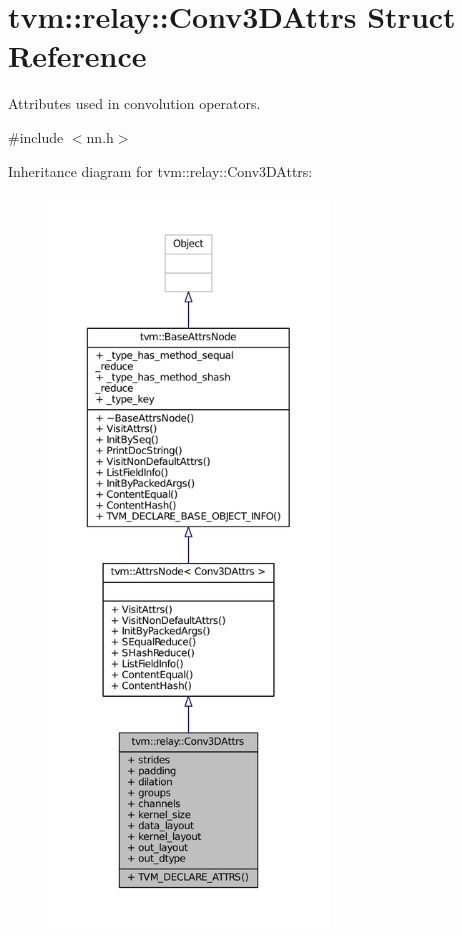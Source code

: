 \hypertarget{structtvm_1_1relay_1_1Conv3DAttrs}{}\section{tvm\+:\+:relay\+:\+:Conv3\+D\+Attrs Struct Reference}
\label{structtvm_1_1relay_1_1Conv3DAttrs}


Attributes used in convolution operators.  




{\ttfamily \#include $<$nn.\+h$>$}



Inheritance diagram for tvm\+:\+:relay\+:\+:Conv3\+D\+Attrs\+:
\nopagebreak
\begin{figure}[H]
\begin{center}
\leavevmode
\includegraphics[height=550pt]{structtvm_1_1relay_1_1Conv3DAttrs__inherit__graph}
\end{center}
\end{figure}


